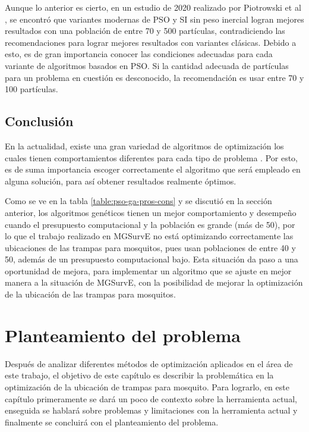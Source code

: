 Aunque lo anterior es cierto, en un estudio de 2020 realizado por Piotrowski
et al \cite{PSOPopulationSize}, se encontró que variantes modernas de PSO y
SI sin peso inercial
logran mejores resultados con una población de entre 70 y 500 partículas,
contradiciendo las recomendaciones para lograr mejores resultados con
variantes clásicas.
Debido a esto, es de gran importancia conocer las condiciones adecuadas para
cada variante de algoritmos basados en PSO. Si la cantidad adecuada de
partículas para un problema en cuestión es desconocido, la recomendación es
usar entre 70 y 100 partículas.

\section{Conclusión}
En la actualidad, existe una gran variedad de algoritmos de optimización los
cuales tienen comportamientos diferentes para cada tipo de problema
\cite{SwarmVsEvol}. Por esto, es de suma importancia escoger correctamente el
algoritmo que será empleado en alguna solución, para así obtener resultados
realmente óptimos.

Como se ve en la tabla \ref{table:pso-ga-pros-cons} y se discutió en la
sección anterior, los algoritmos genéticos tienen un mejor comportamiento y
desempeño cuando el presupuesto computacional y la población es grande
(más de 50), por lo que el trabajo realizado en MGSurvE \cite{MGSurvE} no
está optimizando correctamente las ubicaciones de las trampas para mosquitos,
pues usan poblaciones de entre 40 y 50, además de un presupuesto computacional
bajo. Esta situación da paso a una oportunidad de mejora, para implementar un
algoritmo que se ajuste en mejor manera a la situación de MGSurvE, con la
posibilidad de mejorar la optimización de la ubicación de las trampas para
mosquitos.

\chapter{Planteamiento del problema}\label{chap:planteaminto}
Después de analizar diferentes métodos de optimización aplicados en el área de
este trabajo, el objetivo de este capítulo es describir la problemática en
la optimización de la ubicación de trampas para mosquito. Para lograrlo, en
este 
capítulo primeramente se dará un poco de contexto sobre la herramienta actual,
enseguida se hablará sobre problemas y limitaciones con la herramienta actual
y finalmente se concluirá con el planteamiento del problema.


